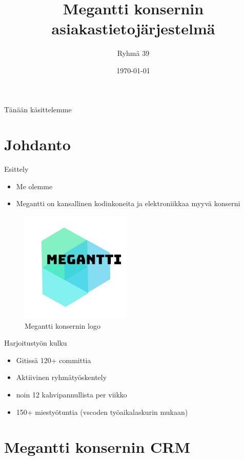 \documentclass{beamer}
\title[JOTU-2019 Megantti]{Megantti konsernin asiakastietojärjestelmä}
\author{Ryhmä 39}
\institute{Tampereen Teknillinen Yliopisto}
\date{\today}
\begin{document}
\begin{frame}
  \titlepage
\end{frame}

\begin{frame}{Tänään käsittelemme}
	\tableofcontents[pausesections]
\end{frame}

\section{Johdanto}

\begin{frame}{Esittely}
\begin{itemize}
  \item<1-> Me olemme
  \item<2-> Megantti on kansallinen kodinkoneita ja elektroniikkaa myyvä konserni
\end{itemize}

\begin{figure}
\includegraphics[scale=0.65]{../megantti.png}
	\caption{Megantti konsernin logo}
\end{figure}

\end{frame}

\begin{frame}{Harjoitustyön kulku}
	\begin{itemize}
		\item<2-> Gitissä 120+ committia
		\item<3-> Aktiivinen ryhmätyöskentely
		\item<4-> noin 12 kahvipannullista per viikko
		\item<5-> 150+ miestyötuntia (vscoden työaikalaskurin mukaan)
	\end{itemize}
\end{frame}


\section{Megantti konsernin CRM}
\end{document}
